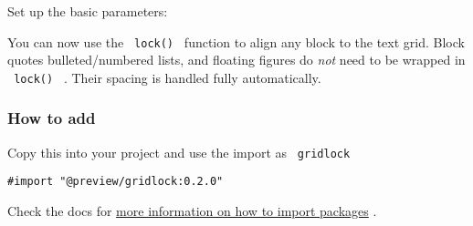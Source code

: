 \begin{Shaded}
\begin{Highlighting}[]
\end{Highlighting}
\end{Shaded}

Set up the basic parameters:

\begin{Shaded}
\begin{Highlighting}[]
\NormalTok{)}
\end{Highlighting}
\end{Shaded}

You can now use the \texttt{\ lock()\ } function to align any block to
the text grid. Block quotes bulleted/numbered lists, and floating
figures do \emph{not} need to be wrapped in \texttt{\ lock()\ } . Their
spacing is handled fully automatically.

\begin{Shaded}
\begin{Highlighting}[]


\NormalTok{))}



\end{Highlighting}
\end{Shaded}

\subsubsection{How to add}\label{how-to-add}

Copy this into your project and use the import as \texttt{\ gridlock\ }

\begin{verbatim}
#import "@preview/gridlock:0.2.0"
\end{verbatim}



Check the docs for
\href{https://typst.app/docs/reference/scripting/\#packages}{more
information on how to import packages} .

